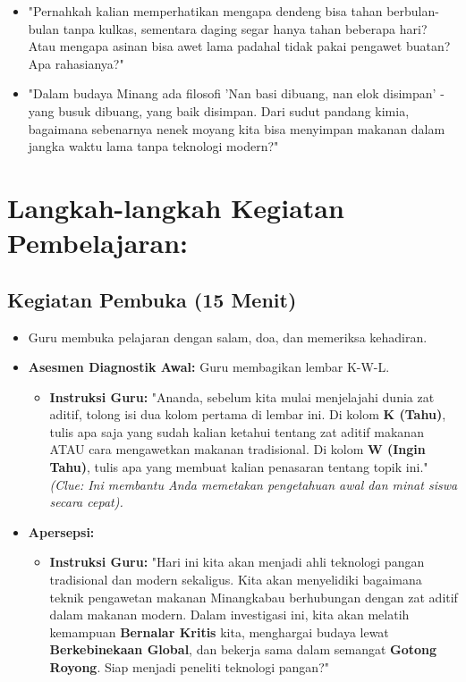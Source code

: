 \documentclass[a4paper,12pt]{article}
\begin{document}
\begin{itemize}
\item "Pernahkah kalian memperhatikan mengapa dendeng bisa tahan berbulan-bulan tanpa kulkas, sementara daging segar hanya tahan beberapa hari? Atau mengapa asinan bisa awet lama padahal tidak pakai pengawet buatan? Apa rahasianya?"
\item "Dalam budaya Minang ada filosofi 'Nan basi dibuang, nan elok disimpan' - yang busuk dibuang, yang baik disimpan. Dari sudut pandang kimia, bagaimana sebenarnya nenek moyang kita bisa menyimpan makanan dalam jangka waktu lama tanpa teknologi modern?"
\end{itemize}

\section{Langkah-langkah Kegiatan Pembelajaran:}

\subsection{Kegiatan Pembuka (15 Menit)}
\begin{itemize}
\item Guru membuka pelajaran dengan salam, doa, dan memeriksa kehadiran.
\item \textbf{Asesmen Diagnostik Awal:} Guru membagikan lembar K-W-L.
    \begin{itemize}
    \item \textbf{Instruksi Guru:} "Ananda, sebelum kita mulai menjelajahi dunia zat aditif, tolong isi dua kolom pertama di lembar ini. Di kolom \textbf{K (Tahu)}, tulis apa saja yang sudah kalian ketahui tentang zat aditif makanan ATAU cara mengawetkan makanan tradisional. Di kolom \textbf{W (Ingin Tahu)}, tulis apa yang membuat kalian penasaran tentang topik ini." \textit{(Clue: Ini membantu Anda memetakan pengetahuan awal dan minat siswa secara cepat).}
    \end{itemize}
\item \textbf{Apersepsi:}
    \begin{itemize}
    \item \textbf{Instruksi Guru:} "Hari ini kita akan menjadi ahli teknologi pangan tradisional dan modern sekaligus. Kita akan menyelidiki bagaimana teknik pengawetan makanan Minangkabau berhubungan dengan zat aditif dalam makanan modern. Dalam investigasi ini, kita akan melatih kemampuan \textbf{Bernalar Kritis} kita, menghargai budaya lewat \textbf{Berkebinekaan Global}, dan bekerja sama dalam semangat \textbf{Gotong Royong}. Siap menjadi peneliti teknologi pangan?"
    \end{itemize}
\end{itemize}
\end{document}
